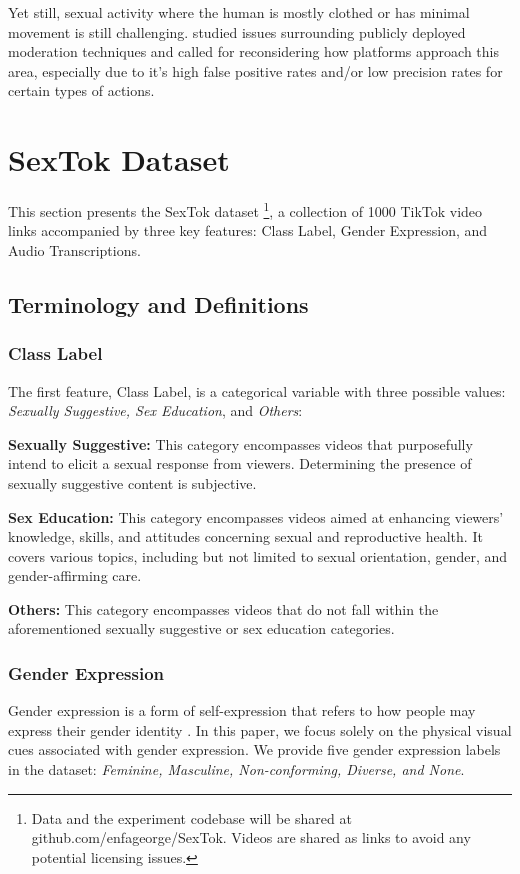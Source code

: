 \documentclass[11pt]{article}
\begin{document}
Yet still, sexual activity where the human is mostly clothed or has minimal movement is still challenging.
\citealp{peters2020sexual} studied issues surrounding publicly deployed moderation techniques and called for reconsidering how platforms approach this area, especially due to it's high false positive rates and/or low precision rates for certain types of actions. 


\section{SexTok Dataset}

This section presents the SexTok dataset \footnote{Data and the experiment codebase will be shared at github.com/enfageorge/SexTok. Videos are shared as links to avoid any potential licensing issues. }, a collection of 1000 TikTok video links accompanied by three key features: Class Label, Gender Expression, and Audio Transcriptions.

\subsection{Terminology and Definitions}

\subsubsection{Class Label}
The first feature, Class Label, is a categorical variable with three possible values: {\em Sexually Suggestive, Sex Education}, and {\em Others}:

{\flushleft \textbf{Sexually Suggestive:}}  This category encompasses videos that purposefully intend to elicit a sexual response from viewers. Determining the presence of sexually suggestive content is subjective.

{\flushleft \textbf{Sex Education:}} This category encompasses videos aimed at enhancing viewers' knowledge, skills, and attitudes concerning sexual and reproductive health. It covers various topics, including but not limited to sexual orientation, gender, and gender-affirming care.

{\flushleft \textbf{Others:}} This category encompasses videos that do not fall within the aforementioned sexually suggestive or sex education categories.

\subsubsection{Gender Expression}
Gender expression is a form of self-expression that refers to how people may express their gender identity \cite{summers2016social}. In this paper, we focus solely on the physical visual cues associated with gender expression. We provide five gender expression labels in the dataset: {\em Feminine, Masculine, Non-conforming, Diverse, and None}.
\end{document}
